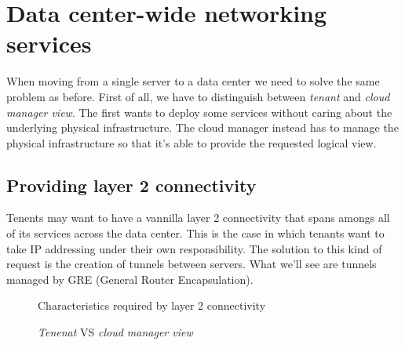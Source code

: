 \section{Data center-wide networking services}
When moving from a single server to a data center we need to solve the same
problem as before. First of all, we have to distinguish between \emph{tenant}
and \emph{cloud manager view}. The first wants to deploy some services without
caring about the underlying physical infrastructure. The cloud manager instead
has to manage the physical infrastructure so that it's able to provide the
requested logical view.

\subsection{Providing layer 2 connectivity}
Tenents may want to have a vannilla layer 2 connectivity that spans amongs all of
its services across the data center. This is the case in which tenants want to
take IP addressing under their own responsibility. The solution to this kind of
request is the creation of tunnels between servers. What we'll see are tunnels
managed by GRE (General Router Encapsulation).

\newpage
\begin{figure}[ht!]
    \centering
    \caption{Characteristics required by layer 2 connectivity}
\end{figure}

\begin{figure}[h!]
    \centering
    \hspace{1.5cm}
    \caption{\emph{Tenenat} VS \emph{cloud manager view}}
\end{figure}

